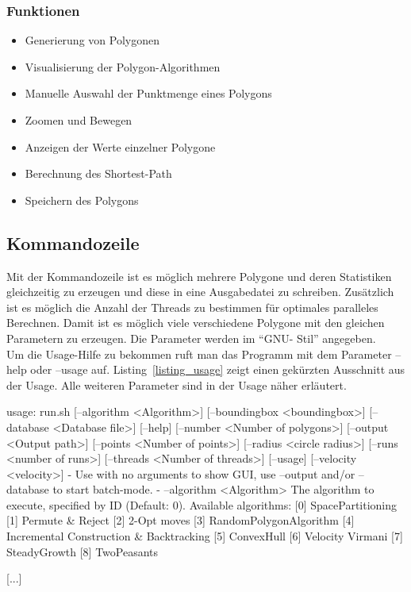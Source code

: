    \subsubsection{Funktionen}

      \begin{itemize}
        \item Generierung von Polygonen
        \item Visualisierung der Polygon-Algorithmen
        \item Manuelle Auswahl der Punktmenge eines Polygons
        \item Zoomen und Bewegen
        \item Anzeigen der Werte einzelner Polygone
        \item Berechnung des Shortest-Path
        \item Speichern des Polygons
      \end{itemize}

  \subsection{Kommandozeile}

    Mit der Kommandozeile ist es möglich mehrere Polygone und deren Statistiken
    gleichzeitig zu erzeugen und diese in eine Ausgabedatei zu schreiben.
    Zusätzlich ist es möglich die Anzahl der Threads zu bestimmen für optimales
    paralleles Berechnen. Damit ist es möglich viele verschiedene Polygone mit
    den gleichen Parametern zu erzeugen. Die Parameter werden im \enquote{GNU-
    Stil} angegeben.\\ Um die Usage-Hilfe zu bekommen ruft man das Programm mit
    dem Parameter --help oder --usage auf. Listing~\ref{listing_usage} zeigt
    einen gekürzten Ausschnitt aus der Usage. Alle weiteren Parameter sind in
    der Usage näher erläutert.

\begin{code}[caption={Usage der Kommandozeile},label=listing_usage]
usage: run.sh [--algorithm <Algorithm>] [--boundingbox <boundingbox>]
       [--database <Database file>] [--help] [--number <Number of
       polygons>] [--output <Output path>] [--points <Number of points>]
       [--radius <circle radius>] [--runs <number of runs>] [--threads
       <Number of threads>] [--usage] [--velocity <velocity>]
-
Use with no arguments to show GUI, use --output and/or --database to start
batch-mode.
-
    --algorithm <Algorithm>         The algorithm to execute, specified by
                                    ID (Default: 0). Available algorithms:
                                    [0] SpacePartitioning
                                    [1] Permute & Reject
                                    [2] 2-Opt moves
                                    [3] RandomPolygonAlgorithm
                                    [4] Incremental Construction &
                                    Backtracking
                                    [5] ConvexHull
                                    [6] Velocity Virmani
                                    [7] SteadyGrowth
                                    [8] TwoPeasants

[...]
\end{code}

